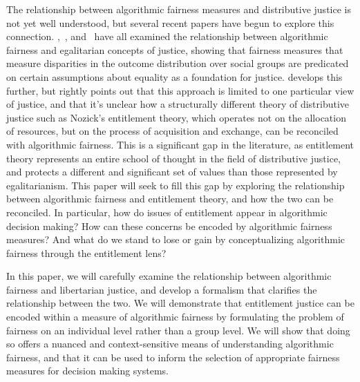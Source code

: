 The relationship between algorithmic fairness measures and distributive justice
is not yet well understood, but several recent papers have begun to explore this
connection. \citep{Binns_2018},~\citep{Hertweck_2024}, and~\citep{Kuppler_2021}
have all examined the relationship between algorithmic fairness and egalitarian
concepts of justice, showing that fairness measures that measure disparities in
the outcome distribution over social groups are predicated on certain
assumptions about equality as a foundation for justice. \citep{Baumann_2023} 
develops this further, but rightly points out that this approach is limited to
one particular view of justice, and that it's unclear how a structurally
different theory of distributive justice such as Nozick's entitlement theory,
which operates not on the allocation of resources, but on the process of 
acquisition and exchange, can be reconciled with algorithmic fairness. This is 
a significant gap in the literature, as entitlement theory represents an entire
school of thought in the field of distributive justice, and protects a different
and significant set of values than those represented by egalitarianism. This
paper will seek to fill this gap by exploring the relationship between
algorithmic fairness and entitlement theory, and how the two can be reconciled.
In particular, how do issues of entitlement appear in algorithmic decision
making? How can these concerns be encoded by algorithmic fairness measures? And
what do we stand to lose or gain by conceptualizing algorithmic fairness through
the entitlement lens?

In this paper, we will carefully examine the relationship between algorithmic
fairness and libertarian justice, and develop a formalism that clarifies the
relationship between the two. We will demonstrate that entitlement justice can
be encoded within a measure of algorithmic fairness by formulating the problem
of fairness on an individual level rather than a group level. We will show that
doing so offers a nuanced and context-sensitive means of understanding
algorithmic fairness, and that it can be used to inform the selection of
appropriate fairness measures for decision making systems.


